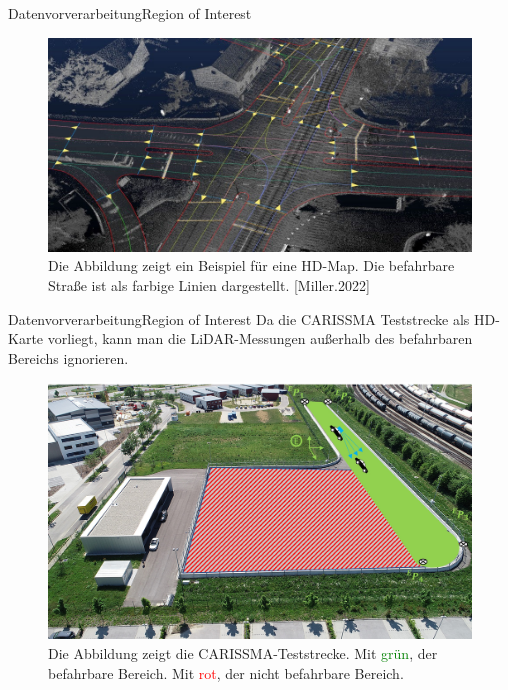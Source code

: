 \documentclass[169, handout	]{THIbeamer} %
\begin{document}
	\begin{frame}{Datenvorverarbeitung}{Region of Interest}
		\begin{figure}
			\includegraphics[scale=0.3]{required/HD-Map.jpg}
			\caption{Die Abbildung zeigt ein Beispiel für eine HD-Map. Die befahrbare Straße ist als farbige Linien dargestellt. [Miller.2022]}			
		\end{figure}
	\end{frame}
	\begin{frame}{Datenvorverarbeitung}{Region of Interest}
		Da die CARISSMA Teststrecke als HD-Karte vorliegt, kann man die LiDAR-Messungen außerhalb des befahrbaren Bereichs ignorieren.
		\begin{figure}
			\includegraphics[scale=0.35]{required/ROI-Teststrecke.jpg}
			\caption{Die Abbildung zeigt die CARISSMA-Teststrecke. Mit \textcolor{green}{grün}, der befahrbare Bereich. Mit \textcolor{red}{rot}, der nicht befahrbare Bereich.}	
		\end{figure}
	\end{frame}
\end{document}
